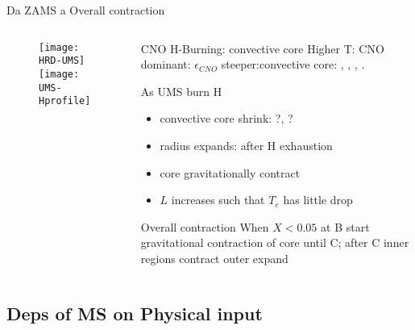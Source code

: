 \begin{frame}{Da ZAMS a Overall contraction}
\begin{columns}[T]\begin{column}{0.4\textwidth}
\begin{figure}[!ht]\texttt{[image: HRD-UMS]}\label{fig:HRD-UMS}
\texttt{[image: UMS-Hprofile]}\label{fig:UMS-Hprofile}\end{figure}
\end{column}\begin{column}{0.6\textwidth}
\begin{block}{CNO H-Burning: convective core}
Higher T: CNO dominant: $\epsilon_{CNO}$ steeper:convective core: , , , \xdiminuisce{\nad{}}.
\end{block}
\begin{block}{As UMS burn H}
\begin{itemize}
    \item convective core shrink: ?\xaumenta{\mu}, ?
    \item radius expands: after H exhaustion
    \item core gravitationally contract
    \item $L$ increases such that $T_e$ has little drop
\end{itemize}
\end{block}
\begin{block}{Overall contraction}
When $X<0.05$ at B start gravitational contraction of core until C; after C inner regions contract outer expand
\end{block}
\end{column}\end{columns}
\end{frame}

\subsection{Deps of MS on Physical input}

